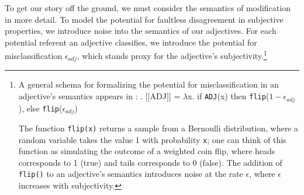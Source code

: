\documentclass{sp}
\newcommand{\gcs}[1]{\textcolor{blue}{[gcs: #1]}}
\newcommand{\sem}[1]{\mbox{$[\![$#1$]\!]$}}
\newcommand{\lam}{\ensuremath{\lambda}}
\begin{document}
To get our story off the ground, we must consider the semantics of modification in more detail. To model the potential for faultless disagreement in subjective properties, we introduce noise into the semantics of our adjectives. 
%
%
For each potential referent an adjective classifies, we introduce the potential for misclassification $\epsilon_{adj}$, which stands proxy for the adjective's subjectivity.\footnote{A general schema for formalizing the potential for misclassification in an adjective's semantics appears in \Next: 
	\ex. \sem{ADJ} = \lam x. if \texttt{ADJ}(x) then \texttt{flip}($1-\epsilon_{adj}$), else \texttt{flip}($\epsilon_{adj}$)
	
The function \texttt{flip(x)} returns a sample from a Bernoulli distribution, where a random variable takes the value 1 with probability \texttt{x}; one can think of this function as simulating the outcome of a weighted coin flip, where heads corresponds to 1 (true) and tails corresponds to 0 (false). The addition of \texttt{flip()} to an adjective's semantics introduces noise at the rate $\epsilon$, where $\epsilon$ increases with subjectivity.} 
%
\end{document}
